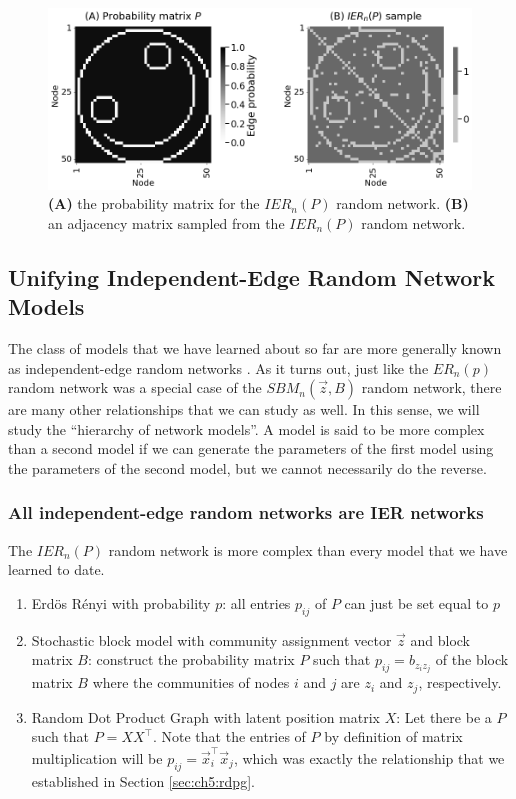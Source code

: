 \begin{figure}
    \centering
    \includegraphics[width=\linewidth]{representations/ch5/Images/ier.png}
    \caption[$IER_n(P)$ parameters]{\textbf{(A)} the probability matrix for the $IER_n(P)$ random network. \textbf{(B)} an adjacency matrix sampled from the $IER_n(P)$ random network.}
    \label{fig:ch5:ier}
\end{figure}

\subsection{Unifying Independent-Edge Random Network Models}

The class of models that we have learned about so far are more generally known as independent-edge random networks \cite{Athreya2017Jan}. As it turns out, just like the $ER_n(p)$ random network was a special case of the $SBM_n(\vec z, B)$ random network, there are many other relationships that we can study as well. In this sense, we will study the ``hierarchy of network models''. A model is said to be more complex than a second model if we can generate the parameters of the first model using the parameters of the second model, but we cannot necessarily do the reverse.

\subsubsection{All independent-edge random networks are IER networks}
\label{sec:ch5:ier:ier_generalises}
The $IER_n(P)$ random network is more complex than every model that we have learned to date.
\begin{enumerate}
    \item Erd\"os R\'enyi with probability $p$: all entries $p_{ij}$ of $P$ can just be set equal to $p$
    \item Stochastic block model with community assignment vector $\vec z$ and block matrix $B$: construct the probability matrix $P$ such that $p_{ij} = b_{z_iz_j}$ of the block matrix $B$ where the communities of nodes $i$ and $j$ are $z_i$ and $z_j$, respectively.
    \item Random Dot Product Graph with latent position matrix $X$: Let there be a $P$ such that $P = XX^\top$. Note that the entries of $P$ by definition of matrix multiplication will be $p_{ij} = \vec x_i^\top \vec x_j$, which was exactly the relationship that we established in Section \ref{sec:ch5:rdpg}.
\end{enumerate}

